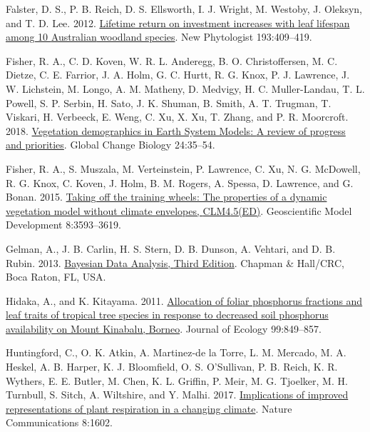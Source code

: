 \documentclass[
  12pt,
  letterpaper,
  DIV=11,
  numbers=noendperiod]{scrartcl}
\newlength{\cslhangindent}
\newlength{\cslentryspacingunit} %
\newenvironment{CSLReferences}[2] %
 {%
  \setlength{\parindent}{0pt}
  \ifodd #1
  \let\oldpar\par
  \def\par{\hangindent=\cslhangindent\oldpar}
  \fi
  \setlength{\parskip}{#2\cslentryspacingunit}
 }%
 {}
\begin{document}
\begin{CSLReferences}{1}{0}
\leavevmode{}%
Falster, D. S., P. B. Reich, D. S. Ellsworth, I. J. Wright, M. Westoby,
J. Oleksyn, and T. D. Lee. 2012.
\href{https://doi.org/10.1111/j.1469-8137.2011.03940.x}{Lifetime return
on investment increases with leaf lifespan among 10 {Australian}
woodland species}. New Phytologist 193:409--419.

\leavevmode{}%
Fisher, R. A., C. D. Koven, W. R. L. Anderegg, B. O. Christoffersen, M.
C. Dietze, C. E. Farrior, J. A. Holm, G. C. Hurtt, R. G. Knox, P. J.
Lawrence, J. W. Lichstein, M. Longo, A. M. Matheny, D. Medvigy, H. C.
Muller-Landau, T. L. Powell, S. P. Serbin, H. Sato, J. K. Shuman, B.
Smith, A. T. Trugman, T. Viskari, H. Verbeeck, E. Weng, C. Xu, X. Xu, T.
Zhang, and P. R. Moorcroft. 2018.
\href{https://doi.org/10.1111/gcb.13910}{Vegetation demographics in
{Earth System Models}: {A} review of progress and priorities}. Global
Change Biology 24:35--54.

\leavevmode{}%
Fisher, R. A., S. Muszala, M. Verteinstein, P. Lawrence, C. Xu, N. G.
McDowell, R. G. Knox, C. Koven, J. Holm, B. M. Rogers, A. Spessa, D.
Lawrence, and G. Bonan. 2015.
\href{https://doi.org/10.5194/gmd-8-3593-2015}{Taking off the training
wheels: The properties of a dynamic vegetation model without climate
envelopes, {CLM4}.5({ED})}. Geoscientific Model Development
8:3593--3619.

\leavevmode{}%
Gelman, A., J. B. Carlin, H. S. Stern, D. B. Dunson, A. Vehtari, and D.
B. Rubin. 2013.
\href{https://books.google.com.pa/books?id=eSHSBQAAQBAJ}{Bayesian {Data
Analysis}, {Third Edition}}. {Chapman \& Hall/CRC}, {Boca Raton, FL,
USA.}

\leavevmode{}%
Hidaka, A., and K. Kitayama. 2011.
\href{https://doi.org/10.1111/j.1365-2745.2011.01805.x}{Allocation of
foliar phosphorus fractions and leaf traits of tropical tree species in
response to decreased soil phosphorus availability on {Mount Kinabalu},
{Borneo}}. Journal of Ecology 99:849--857.

\leavevmode{}%
Huntingford, C., O. K. Atkin, A. Martinez-de la Torre, L. M. Mercado, M.
A. Heskel, A. B. Harper, K. J. Bloomfield, O. S. O'Sullivan, P. B.
Reich, K. R. Wythers, E. E. Butler, M. Chen, K. L. Griffin, P. Meir, M.
G. Tjoelker, M. H. Turnbull, S. Sitch, A. Wiltshire, and Y. Malhi. 2017.
\href{https://doi.org/10.1038/s41467-017-01774-z}{Implications of
improved representations of plant respiration in a changing climate}.
Nature Communications 8:1602.


\end{CSLReferences}
\end{document}
